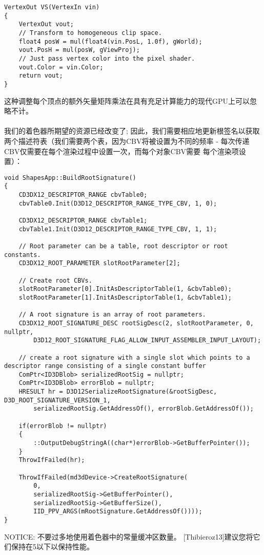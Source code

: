 \begin{lstlisting}
VertexOut VS(VertexIn vin)
{
    VertexOut vout;
    // Transform to homogeneous clip space.
    float4 posW = mul(float4(vin.PosL, 1.0f), gWorld);
    vout.PosH = mul(posW, gViewProj);
    // Just pass vertex color into the pixel shader.
    vout.Color = vin.Color;
    return vout;
}
\end{lstlisting}
\begin{flushleft}
这种调整每个顶点的额外矢量矩阵乘法在具有充足计算能力的现代GPU上可以忽略不计。\\
~\\
我们的着色器所期望的资源已经改变了; 因此，我们需要相应地更新根签名以获取两个描述符表（我们需要两个表，因为CBV将被设置为不同的频率 - 每次传递CBV仅需要在每个渲染过程中设置一次，而每个对象CBV需要 每个渲染项设置）：
\end{flushleft}
\begin{lstlisting}
void ShapesApp::BuildRootSignature()
{
    CD3DX12_DESCRIPTOR_RANGE cbvTable0;
    cbvTable0.Init(D3D12_DESCRIPTOR_RANGE_TYPE_CBV, 1, 0);

    CD3DX12_DESCRIPTOR_RANGE cbvTable1;
    cbvTable1.Init(D3D12_DESCRIPTOR_RANGE_TYPE_CBV, 1, 1);

    // Root parameter can be a table, root descriptor or root constants.
    CD3DX12_ROOT_PARAMETER slotRootParameter[2];

    // Create root CBVs.
    slotRootParameter[0].InitAsDescriptorTable(1, &cbvTable0);
    slotRootParameter[1].InitAsDescriptorTable(1, &cbvTable1);

    // A root signature is an array of root parameters.
    CD3DX12_ROOT_SIGNATURE_DESC rootSigDesc(2, slotRootParameter, 0, nullptr, 
        D3D12_ROOT_SIGNATURE_FLAG_ALLOW_INPUT_ASSEMBLER_INPUT_LAYOUT);

    // create a root signature with a single slot which points to a descriptor range consisting of a single constant buffer
    ComPtr<ID3DBlob> serializedRootSig = nullptr;
    ComPtr<ID3DBlob> errorBlob = nullptr;
    HRESULT hr = D3D12SerializeRootSignature(&rootSigDesc, D3D_ROOT_SIGNATURE_VERSION_1,
        serializedRootSig.GetAddressOf(), errorBlob.GetAddressOf());

    if(errorBlob != nullptr)
    {
        ::OutputDebugStringA((char*)errorBlob->GetBufferPointer());
    }
    ThrowIfFailed(hr);

    ThrowIfFailed(md3dDevice->CreateRootSignature(
        0,
        serializedRootSig->GetBufferPointer(),
        serializedRootSig->GetBufferSize(),
        IID_PPV_ARGS(mRootSignature.GetAddressOf())));
}
\end{lstlisting}
\begin{flushleft}
NOTICE: 不要过多地使用着色器中的常量缓冲区数量。 [Thibieroz13]建议您将它们保持在5以下以保持性能。
\end{flushleft}

